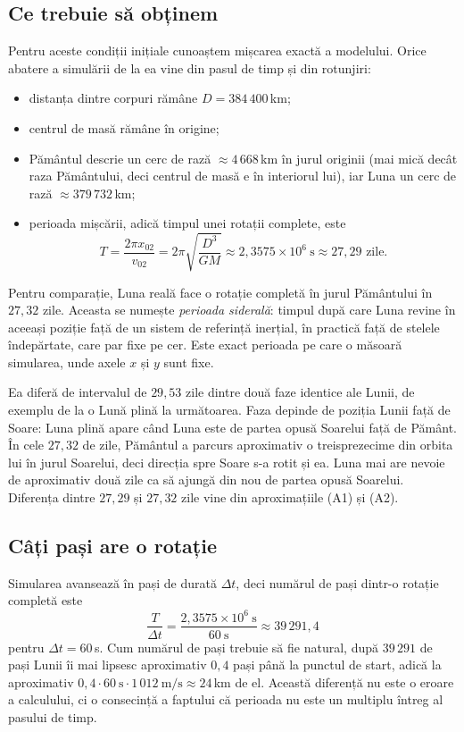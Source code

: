 \documentclass[11pt,a4paper]{article}
\begin{document}
\subsection*{Ce trebuie să obținem}
Pentru aceste condiții inițiale cunoaștem mișcarea exactă a modelului. Orice abatere a simulării de la ea vine din pasul de timp și din rotunjiri:
\begin{itemize}
  \item distanța dintre corpuri rămâne $D = 384\,400$\,km;
  \item centrul de masă rămâne în origine;
  \item Pământul descrie un cerc de rază $\approx 4\,668$\,km în jurul originii (mai mică decât raza Pământului, deci centrul de masă e în interiorul lui), iar Luna un cerc de rază $\approx 379\,732$\,km;
  \item perioada mișcării, adică timpul unei rotații complete, este
  \[
    T = \frac{2\pi x_{02}}{v_{02}} = 2\pi\sqrt{\frac{D^3}{GM}} \approx 2{,}3575\times10^{6}\ \text{s} \approx 27{,}29 \text{ zile}.
  \]
\end{itemize}
Pentru comparație, Luna reală face o rotație completă în jurul Pământului în $27{,}32$ zile. Aceasta se numește \emph{perioada siderală}: timpul după care Luna revine în aceeași poziție față de un sistem de referință inerțial, în practică față de stelele îndepărtate, care par fixe pe cer. Este exact perioada pe care o măsoară simularea, unde axele $x$ și $y$ sunt fixe.

Ea diferă de intervalul de $29{,}53$ zile dintre două faze identice ale Lunii, de exemplu de la o Lună plină la următoarea. Faza depinde de poziția Lunii față de Soare: Luna plină apare când Luna este de partea opusă Soarelui față de Pământ. În cele $27{,}32$ de zile, Pământul a parcurs aproximativ o treisprezecime din orbita lui în jurul Soarelui, deci direcția spre Soare s-a rotit și ea. Luna mai are nevoie de aproximativ două zile ca să ajungă din nou de partea opusă Soarelui. Diferența dintre $27{,}29$ și $27{,}32$ zile vine din aproximațiile (A1) și (A2).

\subsection*{Câți pași are o rotație}
Simularea avansează în pași de durată $\Delta t$, deci numărul de pași dintr-o rotație completă este
\[
  \frac{T}{\Delta t} = \frac{2{,}3575\times10^{6}\ \text{s}}{60\ \text{s}} \approx 39\,291{,}4
\]
pentru $\Delta t = 60$\,s. Cum numărul de pași trebuie să fie natural, după $39\,291$ de pași Lunii îi mai lipsesc aproximativ $0{,}4$ pași până la punctul de start, adică la aproximativ $0{,}4 \cdot 60\ \text{s} \cdot 1\,012\ \text{m/s} \approx 24$\,km de el. Această diferență nu este o eroare a calculului, ci o consecință a faptului că perioada nu este un multiplu întreg al pasului de timp.
\end{document}
